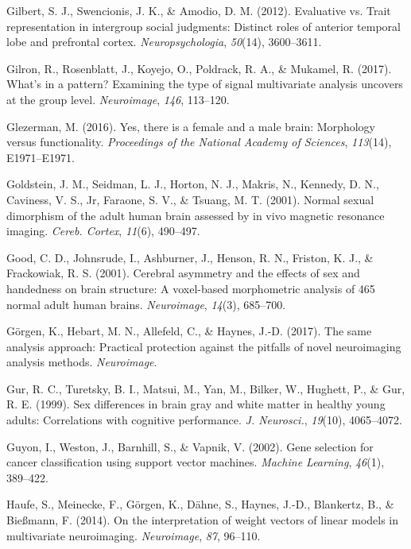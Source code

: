 \documentclass[12pt,american,a4paper,oneside,]{memoir} %
\begin{document}
\leavevmode\hypertarget{ref-gilbert2012evaluative}{}%
Gilbert, S. J., Swencionis, J. K., \& Amodio, D. M. (2012). Evaluative vs. Trait representation in intergroup social judgments: Distinct roles of anterior temporal lobe and prefrontal cortex. \emph{Neuropsychologia}, \emph{50}(14), 3600--3611.

\leavevmode\hypertarget{ref-Gilron2017-tl}{}%
Gilron, R., Rosenblatt, J., Koyejo, O., Poldrack, R. A., \& Mukamel, R. (2017). What's in a pattern? Examining the type of signal multivariate analysis uncovers at the group level. \emph{Neuroimage}, \emph{146}, 113--120.

\leavevmode\hypertarget{ref-Glezerman2016-xl}{}%
Glezerman, M. (2016). Yes, there is a female and a male brain: Morphology versus functionality. \emph{Proceedings of the National Academy of Sciences}, \emph{113}(14), E1971--E1971.

\leavevmode\hypertarget{ref-Goldstein2001-dy}{}%
Goldstein, J. M., Seidman, L. J., Horton, N. J., Makris, N., Kennedy, D. N., Caviness, V. S., Jr, Faraone, S. V., \& Tsuang, M. T. (2001). Normal sexual dimorphism of the adult human brain assessed by in vivo magnetic resonance imaging. \emph{Cereb. Cortex}, \emph{11}(6), 490--497.

\leavevmode\hypertarget{ref-Good2001-ak}{}%
Good, C. D., Johnsrude, I., Ashburner, J., Henson, R. N., Friston, K. J., \& Frackowiak, R. S. (2001). Cerebral asymmetry and the effects of sex and handedness on brain structure: A voxel-based morphometric analysis of 465 normal adult human brains. \emph{Neuroimage}, \emph{14}(3), 685--700.

\leavevmode\hypertarget{ref-Gorgen2017-sy}{}%
Görgen, K., Hebart, M. N., Allefeld, C., \& Haynes, J.-D. (2017). The same analysis approach: Practical protection against the pitfalls of novel neuroimaging analysis methods. \emph{Neuroimage}.

\leavevmode\hypertarget{ref-Gur1999-qj}{}%
Gur, R. C., Turetsky, B. I., Matsui, M., Yan, M., Bilker, W., Hughett, P., \& Gur, R. E. (1999). Sex differences in brain gray and white matter in healthy young adults: Correlations with cognitive performance. \emph{J. Neurosci.}, \emph{19}(10), 4065--4072.

\leavevmode\hypertarget{ref-guyon2002gene}{}%
Guyon, I., Weston, J., Barnhill, S., \& Vapnik, V. (2002). Gene selection for cancer classification using support vector machines. \emph{Machine Learning}, \emph{46}(1), 389--422.

\leavevmode\hypertarget{ref-Haufe2014-el}{}%
Haufe, S., Meinecke, F., Görgen, K., Dähne, S., Haynes, J.-D., Blankertz, B., \& Bießmann, F. (2014). On the interpretation of weight vectors of linear models in multivariate neuroimaging. \emph{Neuroimage}, \emph{87}, 96--110.
\end{document}
